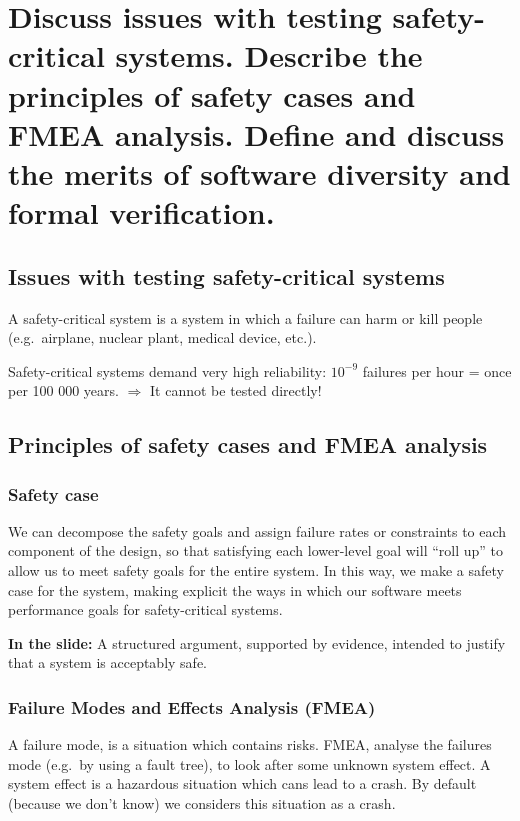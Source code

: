 \clearpage{}
\section{Discuss issues with testing safety-critical systems. Describe the
principles of safety cases and FMEA analysis. Define and discuss the merits
of software diversity and formal verification.}


\subsection{Issues with testing safety-critical systems}

A safety-critical system is a system in which a failure can harm or kill
people (e.g.\ airplane, nuclear plant, medical device, etc.). \newline

Safety-critical systems demand very high reliability:
${10}^{-9}$ failures per hour = once per 100 000 years. 
$\Rightarrow$ It cannot be tested directly!

\subsection{Principles of safety cases and FMEA analysis}

\subsubsection{Safety case}

We can decompose the safety goals and assign failure rates or
constraints to each component of the design, so that satisfying each
lower-level goal will “roll up” to allow us to meet safety goals for the
entire system. In this way, we make a safety case for the system, making
explicit the ways in which our software meets performance goals for
safety-critical systems. \newline

\textbf{In the slide:} A structured argument, supported by evidence, intended to justify that a system is 
acceptably safe. \newline

\subsubsection{Failure Modes and Effects Analysis (FMEA)}

A failure mode, is a situation which contains risks. FMEA, analyse the
failures mode (e.g.\ by using a fault tree), to look after some unknown
system effect. A system effect is a hazardous situation which cans lead
to a crash. By default (because we don’t know) we considers this
situation as a crash. \newline


